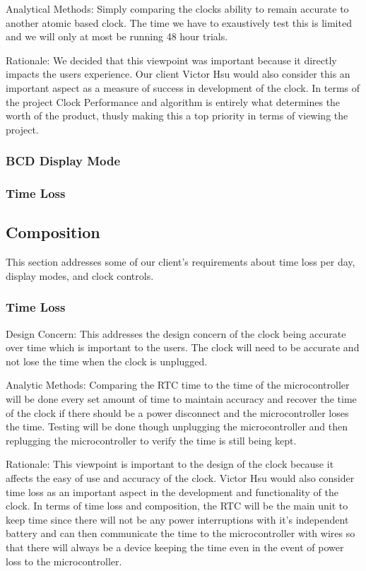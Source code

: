 \documentclass[10pt,draftclsnofoot,onecolumn]{IEEEtran}
\begin{document}
Analytical Methods: Simply comparing the clocks ability to remain accurate to another atomic based clock.
The time we have to exaustively test this is limited and we will only at most be running 48 hour trials.

Rationale: We decided that this viewpoint was important because it directly impacts the users experience.
Our client Victor Hsu would also consider this an important aspect as a measure of success in development of the clock.
In terms of the project Clock Performance and algorithm is entirely what determines the worth of the product, thusly making this a top priority in terms of viewing the project.

\subsubsection{BCD Display Mode}

\subsubsection{Time Loss}

\subsection{Composition}
This section addresses some of our client's requirements about time loss per day, display modes, and clock controls.

\subsubsection{Time Loss}
Design Concern: This addresses the design concern of the clock being accurate over time which is important to the users. The clock will need to be accurate and not lose the time when the clock is unplugged.  

Analytic Methods: Comparing the RTC time to the time of the microcontroller will be done every set amount of time to maintain accuracy and recover the time of the clock if there should be a power disconnect and the microcontroller loses the time. Testing will be done though unplugging the microcontroller and then replugging the microcontroller to verify the time is still being kept.

Rationale: This viewpoint is important to the design of the clock because it affects the easy of use and accuracy of the clock. Victor Hsu would also consider time loss as an important aspect in the development and functionality of the clock. In terms of time loss and composition, the RTC will be the main unit to keep time since there will not be any power interruptions with it's independent battery and can then communicate the time to the microcontroller with wires so that there will always be a device keeping the time even in the event of power loss to the microcontroller.
\end{document}
